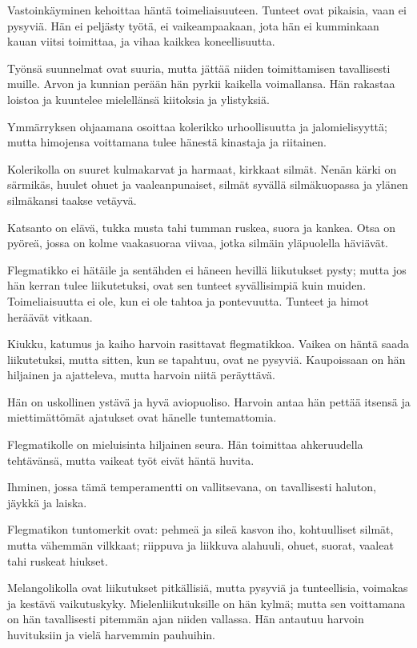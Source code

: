 \documentclass[11pt, twoside, finnish, a5paper]{book}
\begin{document}
Vastoinkäyminen kehoittaa  häntä toimeliaisuuteen.
Tunteet ovat pikaisia, vaan ei pysyviä. Hän ei peljästy
työtä, ei vaikeampaakaan, jota hän ei kumminkaan
kauan viitsi toimittaa, ja vihaa kaikkea koneellisuutta.

Työnsä suunnelmat ovat suuria, mutta jättää niiden
toimittamisen tavallisesti muille. Arvon ja kunnian
perään hän pyrkii kaikella voimallansa. Hän rakastaa
loistoa ja kuuntelee  mielellänsä kiitoksia ja ylistyksiä.
 
Ymmärryksen ohjaamana osoittaa kolerikko urhoollisuutta
ja jalomielisyyttä; mutta himojensa voittamana
tulee hänestä kinastaja ja riitainen.

Kolerikolla on suuret kulmakarvat ja harmaat, kirkkaat
silmät. Nenän kärki on särmikäs, huulet ohuet ja
vaaleanpunaiset, silmät syvällä silmäkuopassa ja ylänen
silmäkansi taakse vetäyvä.

Katsanto on elävä, tukka musta tahi tumman ruskea,
suora ja kankea. Otsa on pyöreä, jossa on kolme
vaakasuoraa viivaa, jotka silmäin yläpuolella häviävät.

Flegmatikko ei hätäile ja sentähden ei häneen hevillä
liikutukset pysty; mutta jos hän kerran tulee liikutetuksi,
ovat sen tunteet syvällisimpiä kuin muiden. 
Toimeliaisuutta ei ole, kun ei ole tahtoa ja pontevuutta. Tunteet
ja himot heräävät vitkaan.

Kiukku, katumus ja kaiho harvoin rasittavat flegmatikkoa.
 Vaikea on häntä saada liikutetuksi, mutta sitten,
kun se tapahtuu, ovat ne pysyviä. Kaupoissaan on hän
hiljainen ja ajatteleva, mutta harvoin niitä peräyttävä.

Hän on uskollinen ystävä ja hyvä aviopuoliso. Harvoin
antaa hän pettää itsensä ja miettimättömät ajatukset
ovat hänelle tuntemattomia.

Flegmatikolle on mieluisinta hiljainen seura. Hän
toimittaa ahkeruudella tehtävänsä, mutta vaikeat työt
eivät häntä huvita.

Ihminen, jossa tämä temperamentti on vallitsevana,
on tavallisesti haluton, jäykkä ja laiska.

Flegmatikon tuntomerkit ovat: pehmeä ja sileä kasvon
iho, kohtuulliset silmät, mutta vähemmän vilkkaat;
riippuva ja liikkuva alahuuli, ohuet, suorat, 
vaaleat tahi ruskeat hiukset.

Melangolikolla ovat liikutukset pitkällisiä, mutta
pysyviä ja tunteellisia, voimakas  ja kestävä vaikutuskyky.
Mielenliikutuksille on hän kylmä; mutta sen voittamana
on hän tavallisesti pitemmän ajan niiden vallassa. Hän
antautuu harvoin huvituksiin ja vielä harvemmin pauhuihin.
\end{document}
